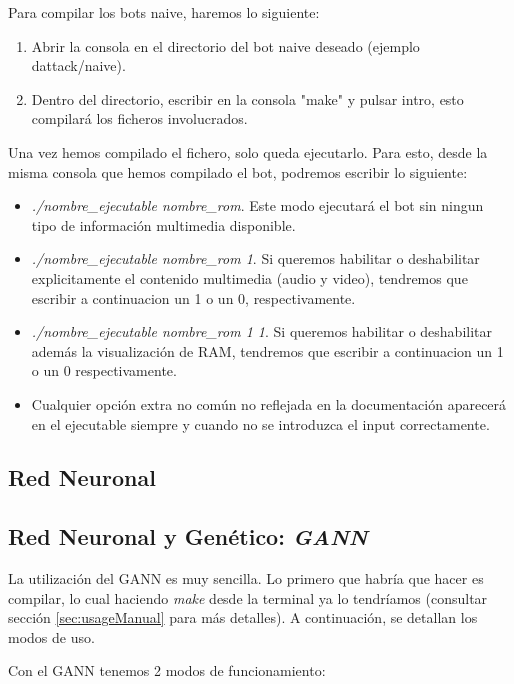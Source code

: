 Para compilar los bots naive, haremos lo siguiente:

\begin{enumerate}
	\item Abrir la consola en el directorio del bot naive deseado (ejemplo dattack/naive).
	\item Dentro del directorio, escribir en la consola "make" y pulsar intro, esto compilará los ficheros involucrados.
\end{enumerate}

Una vez hemos compilado el fichero, solo queda ejecutarlo. Para esto, desde la misma consola que hemos compilado el bot, podremos escribir lo siguiente:

\begin{itemize}
	\item \textit{./nombre\_ejecutable nombre\_rom}. Este modo ejecutará el bot sin ningun tipo de información multimedia disponible.
	\item \textit{./nombre\_ejecutable nombre\_rom 1}. Si queremos habilitar o deshabilitar explicitamente el contenido multimedia (audio y video), tendremos que escribir a continuacion un 1 o un 0, respectivamente.
	\item \textit{./nombre\_ejecutable nombre\_rom 1 1}. Si queremos habilitar o deshabilitar además la visualización de RAM, tendremos que escribir a continuacion un 1 o un 0 respectivamente.
	\item Cualquier opción extra no común no reflejada en la documentación aparecerá en el ejecutable siempre y cuando no se introduzca el input correctamente.
\end{itemize}


\newpage
\subsection{Red Neuronal}


\newpage
\subsection{Red Neuronal y Genético: \textit{GANN}}

La utilización del GANN es muy sencilla. Lo primero que habría que hacer es compilar, lo cual haciendo \textit{make} desde la terminal ya lo tendríamos (consultar sección \ref{sec:usageManual} para más detalles). A continuación, se detallan los modos de uso.

Con el GANN tenemos 2 modos de funcionamiento:

